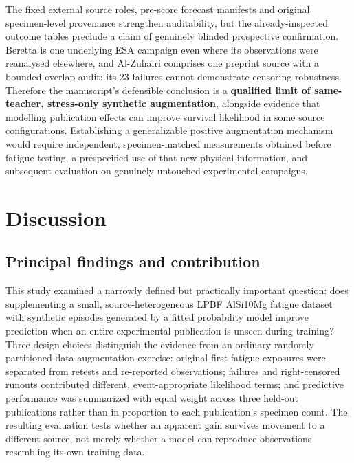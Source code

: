 \documentclass[12pt,a4paper]{article}
\begin{document}
The fixed external source roles, pre-score forecast manifests and original specimen-level provenance strengthen auditability, but the already-inspected outcome tables preclude a claim of genuinely blinded prospective confirmation. Beretta is one underlying ESA campaign even where its observations were reanalysed elsewhere, and Al-Zuhairi comprises one preprint source with a bounded overlap audit; its 23 failures cannot demonstrate censoring robustness. Therefore the manuscript's defensible conclusion is a \textbf{qualified limit of same-teacher, stress-only synthetic augmentation}, alongside evidence that modelling publication effects can improve survival likelihood in some source configurations. Establishing a generalizable positive augmentation mechanism would require independent, specimen-matched measurements obtained before fatigue testing, a prespecified use of that new physical information, and subsequent evaluation on genuinely untouched experimental campaigns.

\section{Discussion}

\subsection{Principal findings and contribution}

This study examined a narrowly defined but practically important question: does supplementing a small, source-heterogeneous LPBF AlSi10Mg fatigue dataset with synthetic episodes generated by a fitted probability model improve prediction when an entire experimental publication is unseen during training? Three design choices distinguish the evidence from an ordinary randomly partitioned data-augmentation exercise: original first fatigue exposures were separated from retests and re-reported observations; failures and right-censored runouts contributed different, event-appropriate likelihood terms; and predictive performance was summarized with equal weight across three held-out publications rather than in proportion to each publication's specimen count. The resulting evaluation tests whether an apparent gain survives movement to a different source, not merely whether a model can reproduce observations resembling its own training data.
\end{document}
